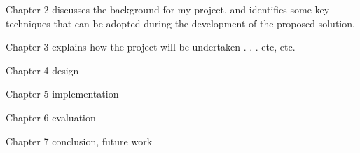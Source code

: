 Chapter 2 discusses the background for my project, and identifies some key techniques that can be adopted during the development 
of the proposed solution.  

Chapter 3 explains how the project will be undertaken . . . etc, etc.  

Chapter 4 design

Chapter 5 implementation

Chapter 6 evaluation

Chapter 7 conclusion, future work







